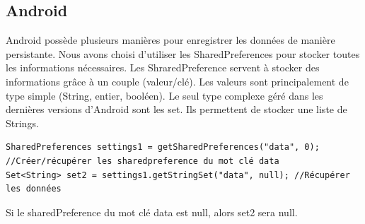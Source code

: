 \documentclass{article}
\begin{document}
\subsection{Android}
Android possède plusieurs manières pour enregistrer les données de manière persistante. Nous avons choisi d'utiliser les SharedPreferences pour stocker toutes les informations nécessaires. 
Les ShraredPreference servent à stocker des informations grâce à un couple (valeur/clé). Les valeurs sont principalement de type simple (String, entier, booléen). Le seul type complexe géré dans les dernières versions d'Android sont les set. Ils permettent de stocker une liste de Strings.
\begin{verbatim}
SharedPreferences settings1 = getSharedPreferences("data", 0); //Créer/récupérer les sharedpreference du mot clé data
Set<String> set2 = settings1.getStringSet("data", null); //Récupérer les données
\end{verbatim}
Si le sharedPreference du mot clé data est null, alors set2 sera null.
\end{document}
